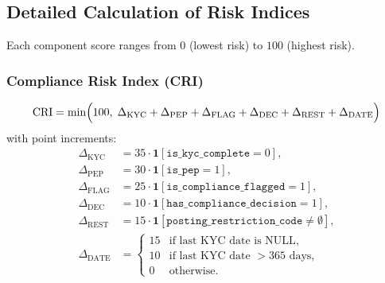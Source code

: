 \subsection{Detailed Calculation of Risk Indices}
Each component score ranges from $0$ (lowest risk) to $100$ (highest risk).

\subsubsection{Compliance Risk Index (CRI)}
\begin{equation}
\label{eq:cri}
\mathrm{CRI} = \min\Bigl(100,\;
\Delta_{\mathrm{KYC}}+\Delta_{\mathrm{PEP}}+\Delta_{\mathrm{FLAG}}
+\Delta_{\mathrm{DEC}}+\Delta_{\mathrm{REST}}+\Delta_{\mathrm{DATE}}\Bigr)
\end{equation}
with point increments:
\begin{equation}
\begin{aligned}
\Delta_{\mathrm{KYC}} &= 35\cdot \mathbf{1}[\texttt{is\_kyc\_complete}=0],\\
\Delta_{\mathrm{PEP}} &= 30\cdot \mathbf{1}[\texttt{is\_pep}=1],\\
\Delta_{\mathrm{FLAG}} &= 25\cdot \mathbf{1}[\texttt{is\_compliance\_flagged}=1],\\
\Delta_{\mathrm{DEC}} &= 10\cdot \mathbf{1}[\texttt{has\_compliance\_decision}=1],\\
\Delta_{\mathrm{REST}} &= 15\cdot \mathbf{1}[\texttt{posting\_restriction\_code}\neq\emptyset],\\
\Delta_{\mathrm{DATE}} &=
\begin{cases}
15 & \text{if last KYC date is NULL},\\
10 & \text{if last KYC date }> 365\text{ days},\\
0 & \text{otherwise}.
\end{cases}
\end{aligned}
\end{equation}

